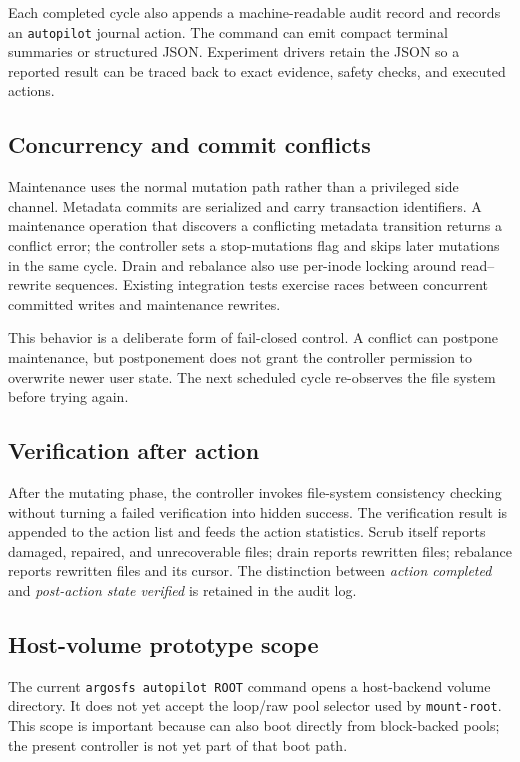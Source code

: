 Each completed cycle also appends a machine-readable audit record and records an \texttt{autopilot} journal action. The command can emit compact terminal summaries or structured JSON. Experiment drivers retain the JSON so a reported result can be traced back to exact evidence, safety checks, and executed actions.

\subsection{Concurrency and commit conflicts}
Maintenance uses the normal \argosfs{} mutation path rather than a privileged side channel. Metadata commits are serialized and carry transaction identifiers. A maintenance operation that discovers a conflicting metadata transition returns a conflict error; the controller sets a stop-mutations flag and skips later mutations in the same cycle. Drain and rebalance also use per-inode locking around read--rewrite sequences. Existing integration tests exercise races between concurrent committed writes and maintenance rewrites.

This behavior is a deliberate form of fail-closed control. A conflict can postpone maintenance, but postponement does not grant the controller permission to overwrite newer user state. The next scheduled cycle re-observes the file system before trying again.

\subsection{Verification after action}
After the mutating phase, the controller invokes file-system consistency checking without turning a failed verification into hidden success. The verification result is appended to the action list and feeds the action statistics. Scrub itself reports damaged, repaired, and unrecoverable files; drain reports rewritten files; rebalance reports rewritten files and its cursor. The distinction between \emph{action completed} and \emph{post-action state verified} is retained in the audit log.

\subsection{Host-volume prototype scope}
\label{sec:prototype-scope}
The current \texttt{argosfs autopilot ROOT} command opens a host-backend volume directory. It does not yet accept the loop/raw pool selector used by \texttt{mount-root}. This scope is important because \argosfs{} can also boot directly from block-backed pools; the present controller is not yet part of that boot path.

